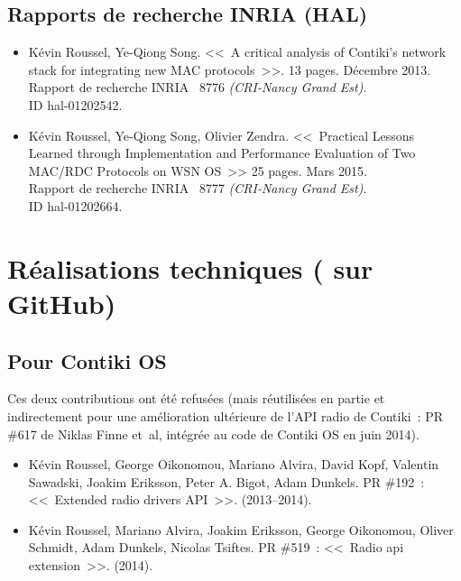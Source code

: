 \subsection*{Rapports de recherche INRIA (HAL)}

\begin{itemize}

\item Kévin Roussel, Ye-Qiong Song.
<<~A critical analysis of Contiki's network stack for integrating
new MAC protocols~>>. 13 pages. Décembre 2013.\\
Rapport de recherche INRIA \no~8776 \textit{(CRI-Nancy Grand Est)}.\\
ID hal-01202542.

\item Kévin Roussel, Ye-Qiong Song, Olivier Zendra.
<<~Practical Lessons Learned through Implementation and Performance
Evaluation of Two MAC/RDC Protocols on WSN OS~>> 25 pages. Mars 2015.\\
Rapport de recherche INRIA \no~8777 \textit{(CRI-Nancy Grand Est)}.\\
ID hal-01202664.

\end{itemize}


\section*{Réalisations techniques ( sur GitHub)}
\label{SecAnxRealTech}


\subsection*{Pour Contiki OS}

Ces deux contributions ont été refusées (mais réutilisées en partie et
indirectement pour une amélioration ultérieure de l'API radio de Contiki~:
PR \#617 de Niklas Finne et~al, intégrée au code de Contiki OS en juin 2014).


\begin{itemize}

\item Kévin Roussel, George Oikonomou, Mariano Alvira, David Kopf,
      Valentin Sawadski, Joakim Eriksson, Peter A. Bigot, Adam Dunkels.
PR \#192~: <<~Extended radio drivers API~>>.
(2013--2014).

\item Kévin Roussel, Mariano Alvira, Joakim Eriksson, George Oikonomou,
      Oliver Schmidt, Adam Dunkels, Nicolas Tsiftes.
PR \#519~: <<~Radio api extension~>>.
(2014).

\end{itemize}


